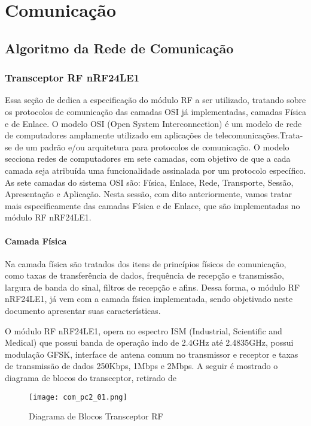 \chapter[Comunicação]{Comunicação}
\section{Algoritmo da Rede de Comunicação}
\subsection{Transceptor RF nRF24LE1}
Essa seção de dedica a especificação do módulo RF a ser utilizado, tratando sobre os protocolos de comunicação das camadas OSI já implementadas, camadas Física e de Enlace. O modelo OSI (Open System Interconnection) é um modelo de rede de computadores amplamente utilizado em aplicações de telecomunicações.Trata-se de um padrão e/ou arquitetura para protocolos de comunicação. O modelo secciona redes de computadores em sete camadas, com objetivo de que a cada camada seja atribuída uma funcionalidade assinalada por um protocolo específico. As sete camadas do sistema OSI são: Física, Enlace, Rede, Transporte, Sessão, Apresentação e Aplicação. Nesta sessão, com dito anteriormente, vamos tratar mais especificamente das camadas Física e de Enlace, que são implementadas no módulo RF nRF24LE1.

\subsubsection{Camada Física}

Na camada física são tratados dos itens de princípios físicos de comunicação, como taxas de transferência de dados, frequência de recepção e transmissão, largura de banda do sinal, filtros de recepção e afins. Dessa forma, o módulo RF nRF24LE1, já vem com a camada física implementada, sendo objetivado neste documento apresentar suas características.

O módulo RF nRF24LE1, opera no espectro ISM (Industrial, Scientific and Medical) que possui banda de operação indo de 2.4GHz até 2.4835GHz, possui modulação GFSK, interface de antena comum no transmissor e receptor e taxas de transmissão de dados 250Kbps, 1Mbps e 2Mbps. A seguir é mostrado o diagrama de blocos do transceptor, retirado de \cite{bib_com_01_yas}
\begin{figure}[H]
\centering
	\label{com_pc2_01}
	\texttt{[image: com\_pc2\_01.png]}
   \caption{Diagrama de Blocos Transceptor RF}
\end{figure}

